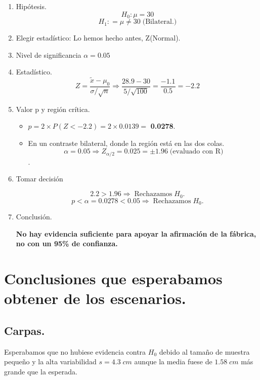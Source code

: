 \documentclass[a4paper,12pt]{article} %
\begin{document}
\begin{enumerate}
    \item Hipótesis.
    \[H_0: \mu = 30\]
    \[H_1: = \mu \neq 30 \; \text{(Bilateral.)} \]

    \item Elegir estadístico: Lo hemos hecho antes, Z(Normal).

    \item Nivel de significancia \(\alpha = 0.05 \)
    
    \item Estadístico.
    \[Z = \frac{\tilde{x} - \mu_0}{\sigma / \sqrt{n}} \Rightarrow \frac{28.9 - 30}{5 / \sqrt{100}} = \frac{-1.1}{0.5}= -2.2\]

    \item Valor p y región crítica.
    \begin{itemize}
        \item \(p = 2 \times P (Z <  -2.2) = 2 \times 0.0139 = \) \textbf{0.0278}.
        \item En un contraste bilateral, donde la región está en las dos colas. 
        \[\alpha = 0.05 \Rightarrow Z_{\alpha/2} = 0.025 = \pm 1.96 \; \text{(evaluado con R)} \].
    \end{itemize}
    \item Tomar decisión
        
        \[2.2 > 1.96 \Rightarrow \; \text{Rechazamos} \; H_0.\]
        \[p < \alpha = 0.0278 < 0.05 \Rightarrow \; \text{Rechazamos} \; H_0.\]

    \item Conclusión.

    \begin{justify}
        \textbf{No hay evidencia suficiente para apoyar la afirmación de la fábrica, no con un 95\% de confianza.}
    \end{justify}
\end{enumerate}

\section{Conclusiones que esperabamos obtener de los escenarios.}

\subsection{Carpas.}

\begin{justify}
    Esperabamos que no hubiese evidencia contra \(H_0\) debido al tamaño de muestra pequeño y la alta variabilidad \(s = 4.3 \; cm\) aunque la media fuese de \( 1.58 \; cm\) más grande que la esperada.
\end{justify}
\end{document}
